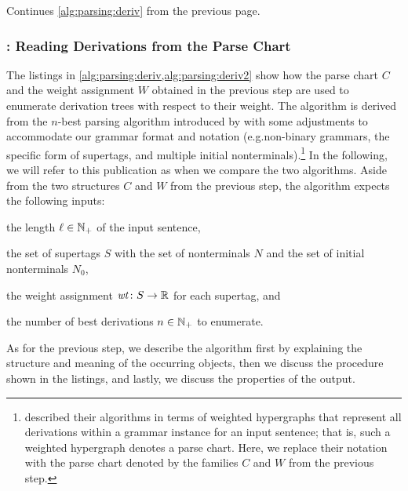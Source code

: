 \documentclass[../../document.tex]{subfiles}
\begin{document}
    \begin{algorithm}
        \caption{\label{alg:parsing:deriv2}
            Continues \cref{alg:parsing:deriv} from the previous page.
        }
        
    \end{algorithm}

    \subsubsection*{: Reading Derivations from the Parse Chart}
    The listings in \cref{alg:parsing:deriv,alg:parsing:deriv2} show how the parse chart \(C\) and the weight assignment \(W\) obtained in the previous step are used to enumerate derivation trees with respect to their weight.
    The algorithm is derived from the \(n\)-best parsing algorithm introduced by \citet[Algorithms~1, 2 and 3]{HuaChia05} with some adjustments to accommodate our grammar format and notation (e.g.\@ non-binary grammars, the specific form of  supertags, and multiple initial nonterminals).\footnote{
         described their algorithms in terms of weighted hypergraphs that represent all derivations within a grammar instance for an input sentence; that is, such a weighted hypergraph denotes a parse chart.
        Here, we replace their notation with the parse chart denoted by the families \(C\) and \(W\) from the previous step.
    }
    In the following, we will refer to this publication as  when we compare the two algorithms.
    Aside from the two structures \(C\) and \(W\) from the previous step, the algorithm expects the following inputs:
    \begin{inparaitem}[]
        \item the length \(\ell \in \mathbb{N}_+\) of the input sentence,
        \item the set of supertags \(S\)  with the set of nonterminals \(N\) and the set of initial nonterminals \(N_0\),
        \item the weight assignment \(\mathit{wt}\colon S \to \mathbb{R}\) for each supertag, and
        \item the number of best derivations \(n \in \mathbb{N}_+\) to enumerate.
    \end{inparaitem}
    As for the previous step, we describe the algorithm first by explaining the structure and meaning of the occurring objects, then we discuss the procedure shown in the listings, and lastly, we discuss the properties of the output.
    
\end{document}
